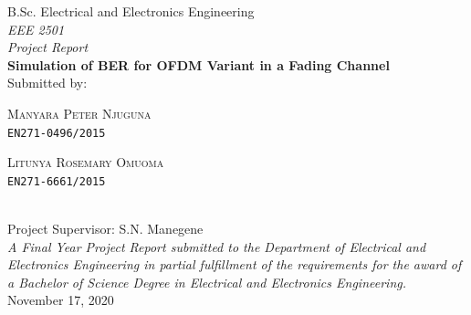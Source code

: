 \begin{spacing}{1.1}
\begin{titlepage}
\begin{center}
{		}
		\vfill
		B.Sc. Electrical and Electronics Engineering\\
		\vfill
		{\itshape
			EEE 2501\\
			Project Report\\
		}
		\vfill
		{\Large\bfseries
			Simulation of BER for OFDM Variant in a Fading Channel\\
		}
		\vfill
		{\normalsize
			Submitted by:
		}\\[0.5cm]
		\hfill
		\begin{minipage}{0.45\textwidth}
			\raggedleft\normalsize
			\textsc{Manyara Peter Njuguna}\\
			\texttt{EN271-0496/2015}
		\end{minipage}
		\hfill
		\begin{minipage}{0.45\textwidth}
			\raggedright\normalsize
			\textsc{Litunya Rosemary Omuoma}\\
			\texttt{EN271-6661/2015}
		\end{minipage}
		\hfill\\
		\vfill
		{\large
			Project Supervisor: S.N. Manegene
		}\\
		\vfill
		{\normalsize\itshape
			A Final Year Project Report submitted to the Department of Electrical and
		Electronics Engineering in partial fulfillment of the requirements for the award of a
		Bachelor of Science Degree in Electrical and Electronics Engineering.
		}\\
		\vfill
		{\large November 17, 2020}
  \end{center}
\end{titlepage}
\end{spacing}
